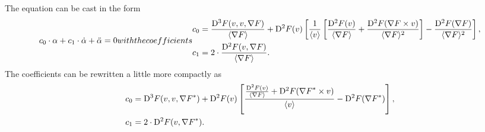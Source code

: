 The equation can be cast in the form
\begin{subequations}
    \begin{align}
        c_0 \mult \alpha  +
        c_1 \mult \dot{ \alpha }  +
        \ddot{ \alpha }
        =  0
    \end{align}
    with the coefficients
    \begin{align}
        c_0
        &=
        \frac{ \diff{3}{F}( v, v, \grad{F} ) }{ \skaq{\grad{F}} }  +
        \diff{2}{F}( v )
        \left[ \frac{ 1 }{ \skaq{v} }
        \left[ \frac{ \diff{2}{F}( v ) }{ \skaq{\grad{F}} }  +
        \frac{ \diff{2}{F}( \grad{F} \times v ) }{ \skaq{\grad{F}}^2 } \right]
        -  \frac{ \diff{2}{F}( \grad{F} ) }{ \skaq{\grad{F}}^2 } \right] ,
        \\
        c_1
        &=
        2 \mult \frac{ \diff{2}{F}( v, \grad{F} ) }{ \skaq{\grad{F}} } .
    \end{align}
\end{subequations}
The coefficients can be rewritten a little more compactly as
\begin{subequations}
    \begin{align}
        c_0   &=
        \mathrm{D}^{ 3 }F( v, v, {\nabla F}^* )  +
        \mathrm{D}^{ 2 }F( v )
        \left[ \frac{ \frac{ \mathrm{D}^{ 2 }F( v ) }{ \langle \nabla F \rangle }  +
        \mathrm{D}^{ 2 }F( {\nabla F}^* \times v ) }{ \langle v \rangle }  -
        \mathrm{D}^{ 2 }F( {\nabla F}^* ) \right] ,
        \\
        c_1   &=   2 \cdot \mathrm{D}^{ 2 }F( v, {\nabla F}^* ) .
    \end{align}
\end{subequations}

